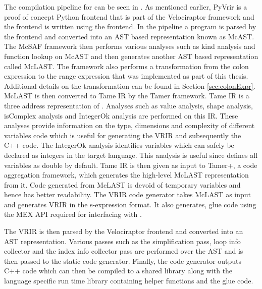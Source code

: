 The compilation pipeline for \velocty can be seen in . As mentioned earlier, PyVrir is a proof of concept Python frontend that is part of the Velociraptor framework and the \matlab frontend is written using the \mclab frontend. In the \mclab pipeline a \matlab program is parsed by the \mclab frontend and converted into an AST based representation known as McAST. The McSAF\cite{doherty11} framework then performs various analyses such as kind analysis\cite{Doherty:2011:KAM:2076021.2048077} and function lookup on McAST and then generates another AST based representation called McLAST. The framework also performs a transformation from the colon expression to the range expression that was implemented as part of this thesis. Additional details on the transformation can be found in Section \ref{sec:colonExpr}. McLAST is then converted to Tame IR\cite{Dubrau:2012} by the Tamer\cite{Dubrau:2012} framework. Tame IR is a three address representation of \matlab. Analyses such as value analysis, shape analysis, isComplex analysis and IntegerOk analysis are performed on this IR. These analyses provide information on the type, dimensions and complexity of different variables code which is useful for generating the VRIR and subsequently the C++ code. The IntegerOk analysis identifies variables which can safely be declared as integers in the target language. This analysis is useful since \matlab defines all variables as double by default. Tame IR is then given as input to Tamer+, a code aggregation framework, which generates the high-level McLAST representation from it. Code generated from McLAST is devoid of temporary variables and hence has better readability. The VRIR code generator takes McLAST as input and generates VRIR in the s-expression format. It also generates, glue code using the \matlab MEX\cite{mex} API required for interfacing with \matlab.

The VRIR is then parsed by the Velociraptor frontend and converted into an AST representation. Various passes such as the simplification pass, loop info collector and the index info collector pass are performed over the AST and is then passed to the static code generator. Finally, the code generator outputs C++ code which can then be compiled to a shared library along with the language specific run time library containing helper functions and the glue code. 
